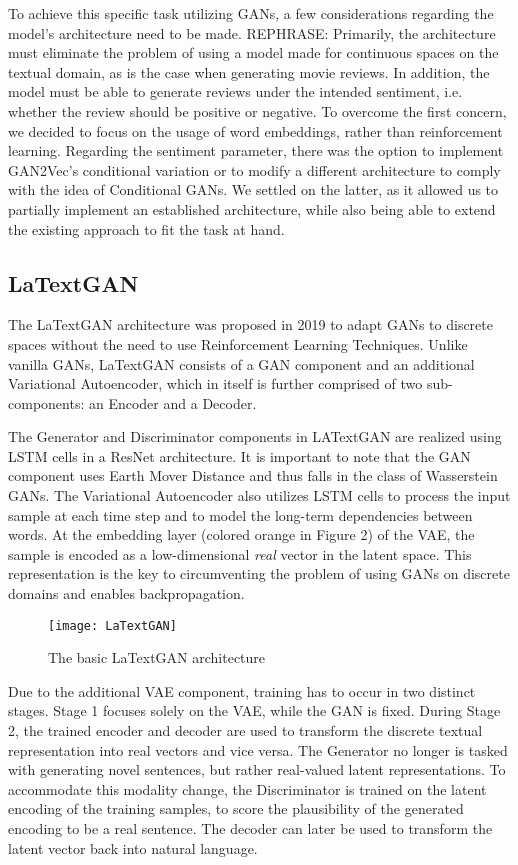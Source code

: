 \documentclass[../main]{subfiles}
\begin{document}
To achieve this specific task utilizing GANs, a few considerations regarding the model's architecture need to be made.  REPHRASE: Primarily, the architecture must eliminate the problem of using a model made for continuous spaces on the textual domain, as is the case when generating movie reviews.  In addition, the model must be able to generate reviews under the intended sentiment, i.e. whether the review should be positive or negative.  To overcome the first concern, we decided to focus on the usage of word embeddings, rather than reinforcement learning. Regarding the sentiment parameter, there was the option to implement GAN2Vec's conditional variation or to modify a different architecture to comply with the idea of Conditional GANs. We settled on the latter, as it allowed us to partially implement an established architecture, while also being able to extend the existing approach to fit the task at hand.

\subsection{LaTextGAN \cite{latextgan}}
The LaTextGAN architecture was proposed in 2019 to adapt GANs to discrete spaces without the need to use Reinforcement Learning Techniques. Unlike vanilla GANs, LaTextGAN consists of a GAN component and an additional Variational Autoencoder, which in itself is further comprised of two sub-components: an Encoder and a Decoder.  

The Generator and Discriminator components in LATextGAN are realized using LSTM cells in a ResNet architecture.  It is important to note that the GAN component uses Earth Mover Distance and thus falls in the class of Wasserstein GANs. The Variational Autoencoder also utilizes LSTM cells to process the input sample at each time step and to model the long-term dependencies between words.  At the embedding layer (colored orange in Figure 2) of the VAE, the sample is encoded as a low-dimensional \textit{real} vector in the latent space. This representation is the key to circumventing the problem of using GANs on discrete domains and enables backpropagation.


\begin{figure}[h]
	\centering
	\texttt{[image: LaTextGAN]}
	\caption{The basic LaTextGAN architecture}
\end{figure}

Due to the additional VAE component, training has to occur in two distinct stages. Stage 1 focuses solely on the VAE, while the GAN is fixed. During Stage 2, the trained encoder and decoder are used to transform the discrete textual representation into real vectors and vice versa. The Generator no longer is tasked with generating novel sentences, but rather real-valued latent representations. To accommodate this modality change, the Discriminator is trained on the latent encoding of the training samples, to score the plausibility of the generated encoding to be a real sentence. The decoder can later be used to transform the latent vector back into natural language.
\end{document}
